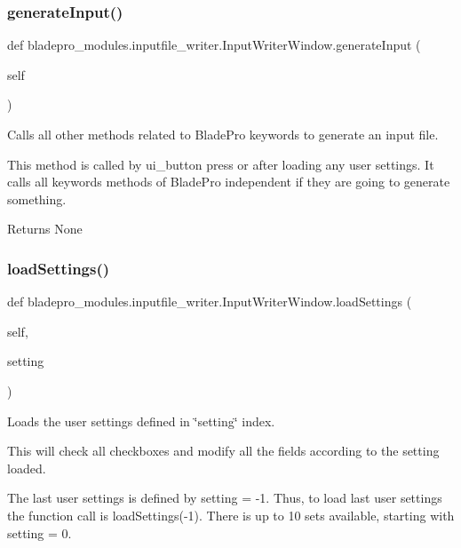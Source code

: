 \subsubsection{\texorpdfstring{generate\+Input()}{generateInput()}}
{\footnotesize\ttfamily def bladepro\+\_\+modules.\+inputfile\+\_\+writer.\+Input\+Writer\+Window.\+generate\+Input (\begin{DoxyParamCaption}\item[{}]{self }\end{DoxyParamCaption})}



Calls all other methods related to Blade\+Pro keywords to generate an input file. 

This method is called by ui\+\_\+button press or after loading any user settings. It calls all keywords methods of Blade\+Pro independent if they are going to generate something.

\begin{DoxyReturn}{Returns}
None 
\end{DoxyReturn}
\hypertarget{a00071_a0c4f30850537553db0ff2e27059733a4}{}\label{a00071_a0c4f30850537553db0ff2e27059733a4} 
\subsubsection{\texorpdfstring{load\+Settings()}{loadSettings()}}
{\footnotesize\ttfamily def bladepro\+\_\+modules.\+inputfile\+\_\+writer.\+Input\+Writer\+Window.\+load\+Settings (\begin{DoxyParamCaption}\item[{}]{self,  }\item[{}]{setting }\end{DoxyParamCaption})}



Loads the user settings defined in \char`\"{}setting\char`\"{} index. 

This will check all checkboxes and modify all the fields according to the setting loaded.

The last user settings is defined by setting = -\/1. Thus, to load last user settings the function call is load\+Settings(-\/1). There is up to 10 sets available, starting with setting = 0.


